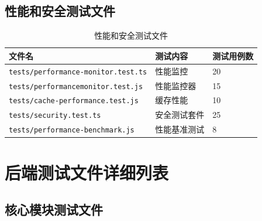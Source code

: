 \documentclass[12pt,a4paper,openany]{report}
\begin{document}
\subsection{性能和安全测试文件}

\begin{table}[h]
\centering
\caption{性能和安全测试文件}
\begin{tabular}{|l|l|l|}
\hline
\textbf{文件名} & \textbf{测试内容} & \textbf{测试用例数} \\
\hline
\texttt{tests/performance-monitor.test.ts} & 性能监控 & 20 \\
\texttt{tests/performancemonitor.test.js} & 性能监控器 & 15 \\
\texttt{tests/cache-performance.test.js} & 缓存性能 & 10 \\
\texttt{tests/security.test.ts} & 安全测试套件 & 25 \\
\texttt{tests/performance-benchmark.js} & 性能基准测试 & 8 \\
\hline
\end{tabular}
\end{table}

\section{后端测试文件详细列表}

\subsection{核心模块测试文件}
\end{document}
